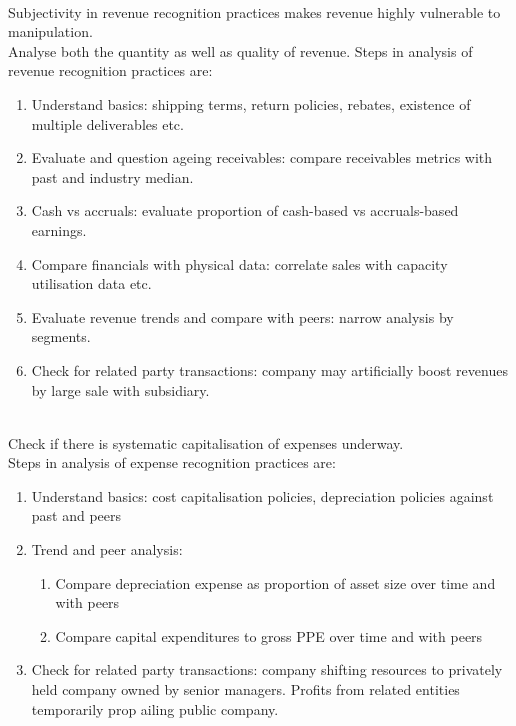 \begin{remark} \\
Subjectivity in revenue recognition practices makes revenue highly vulnerable to manipulation.\\
Analyse both the quantity as well as quality of revenue.
Steps in analysis of revenue recognition practices are:
\begin{enumerate}[label=\roman*.]
\setlength{\itemsep}{0pt}
\item Understand basics: shipping terms, return policies, rebates, existence of multiple deliverables etc.
\item Evaluate and question ageing receivables: compare receivables metrics with past and industry median.
\item Cash vs accruals: evaluate proportion of cash-based vs accruals-based earnings.
\item Compare financials with physical data: correlate sales with capacity utilisation data etc.
\item Evaluate revenue trends and compare with peers: narrow analysis by segments.
\item Check for related party transactions: company may artificially boost revenues by large sale with subsidiary.
\end{enumerate}
\end{remark}

\begin{remark} \\
Check if there is systematic capitalisation of expenses underway.\\
Steps in analysis of expense recognition practices are:
\begin{enumerate}[label=\roman*.]
\setlength{\itemsep}{0pt}
\item Understand basics: cost capitalisation policies, depreciation policies against past and peers
\item Trend and peer analysis:
\begin{enumerate}[label=\arabic*.]
\setlength{\itemsep}{0pt}
\item Compare depreciation expense as proportion of asset size over time and with peers
\item Compare capital expenditures to gross PPE over time and with peers
\end{enumerate}
\item Check for related party transactions: company shifting resources to privately held company owned by senior managers. Profits from related entities temporarily prop ailing public company.
\end{enumerate}
\end{remark}

